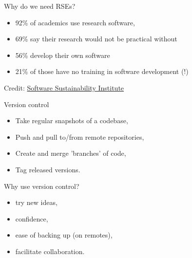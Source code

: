 \documentclass{beamer} %
\begin{document}
  \begin{frame}{Why do we need RSEs?}
    \begin{itemize}
      \item 92\% of academics use research software,
      \item 69\% say their research would not be practical without 
      \item 56\% develop their own software
      \item 21\% of those have no training in software development (!)
    \end{itemize}
    \vspace{2cm}
    \tiny
    Credit: \href{https://www.software.ac.uk/}{Software Sustainability Institute}
  \end{frame}


\begin{frame}[label=GIT]{Version control}
  \pause
  \begin{itemize}
    \item Take regular snapshots of a codebase,
    \item Push and pull to/from remote repositories,
    \item Create and merge 'branches' of code,
    \item Tag released versions.
  \end{itemize}
  
\end{frame}

  \begin{frame}[label=GIT]{Why use version control?}
    \pause
    \begin{itemize}
      \item try new ideas,
      \item confidence,
      \item ease of backing up (on remotes),
      \item facilitate collaboration.
    \end{itemize}
    
  \end{frame}
\end{document}

